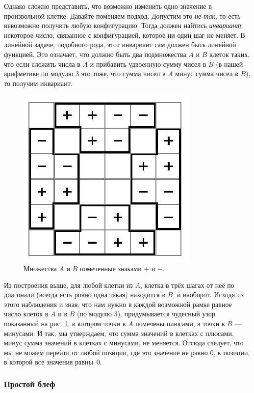 Однако сложно представить, что возможно изменить одно значение в произвольной клетке.
Давайте поменяем подход.
Допустим это \emph{не так}, то есть невозможно получить любую конфигурацию.
Тогда должен найтись \emph{инвариант}: некоторое число, связанное с конфигурацией, которое ни один шаг не меняет.
В линейной задаче, подобного рода, этот инвариант сам должен быть линейной функцией.
Это означает, что должно быть два подмножества $A$ и $B$ клеток таких, что если сложить числа в $A$ и прибавить удвоенную сумму чисел в $B$ (в нашей арифметике по модулю $3$ это тоже, что сумма чисел в $A$ минус сумма чисел в $B$), то получим инвариант.

\begin{figure}[t!]
\centering
\includegraphics[scale=1]{pics/chess2}
\caption{Множества $A$ и $B$ помеченные знаками $+$ и $-$.}
\label{pic:chess2}
\end{figure}

Из построения выше, для любой клетки из $A$, клетка в трёх шагах от неё по диагонали (всегда есть ровно одна такая) находится в $B$, и наоборот.
Исходя из этого наблюдения и зная, что нам нужно в каждой возможной рамке равное число клеток в $A$ и в $B$ (по модулю 3), придумывается чудесный узор показанный на рис. \ref{pic:chess2}, в котором точки в $A$ помечены плюсами, а точки в $B$ --- минусами.
И так, мы утверждаем, что сумма значений в клетках с плюсами, минус сумма значений в клетках с минусами, не меняется.
Отсюда следует, что мы не можем перейти от любой позиции, где это значение не равно $0$, к позиции, в которой все значения равны~$0$.

\subsubsection*{Простой блеф}

